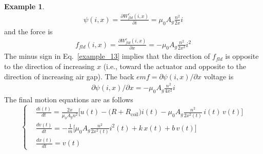 \documentclass[11pt,a4paper,oneside]{book}
\numberwithin{equation}{section}
\theoremstyle{it}
\theoremstyle{definition}
\newtheorem{example}{Example}[section]
\begin{document}
\begin{example}
\begin{equation}\label{example_12}	
	\begin{aligned}
		\psi(i,x)=\frac{\partial W_{fld}^c(i,x)}{\partial i}= \mu_0A_g\frac{n^2}{2x} i
	\end{aligned}
\end{equation}
and the force is 
\begin{equation}\label{example_13}	
	\begin{aligned}
		f_{fld}(i,x)=\frac{\partial W_{fld}^c(i,x)}{\partial x}= -\mu_0A_g\frac{n^2}{2x^2} i^2
	\end{aligned}
\end{equation}
The minus sign in Eq.~\eqref{example_13} implies that the direction of $f_{fld}$ is opposite to the direction of increasing $x$ (i.e., toward the actuator and opposite to the direction of increasing air gap). 
The back $emf = \partial \psi(i,x)/\partial x$ voltage is 
  \begin{equation}\label{example_14}	
  	\begin{aligned}
  		\partial \psi(i,x)/\partial x= -\mu_0A_g\frac{n^2}{4x^2} i
  	\end{aligned}
  \end{equation}
The final motion equations are as follows
\begin{equation}\label{example_15}	
	\left\lbrace 
	\begin{aligned}
		&\frac{di(t)}{dt} = \frac{2x}{\mu_0A_gn^2} \Big[u(t) -\big(R+R_{\text{coil}}\big)i(t) -\mu_0A_g\frac{n^2}{2x^2(t)}\, i(t)\,v(t)\Big] \\[8pt]
		&\frac{dv(t)}{dt} =  -\frac{1}{m}\Bigg[\mu_0A_g\frac{n^2}{2x^2(t)} i^2(t) + k\,x(t)+b\,v(t)\Bigg] \\[8pt]
		&\frac{dx(t)}{dt} = v(t)
	\end{aligned}
	\right. 
\end{equation}
\end{example}
\end{document}
